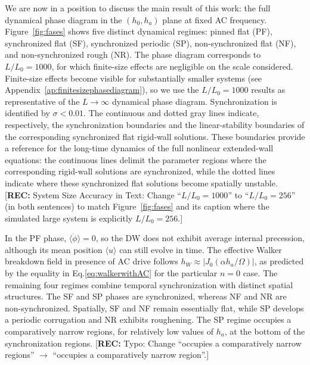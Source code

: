 \documentclass[prb,aps,twocolumn,superscriptaddress,floatfix]{revtex4-1}
\newcommand{\rec}[1]{{\color{magenta}[\textbf{REC:} #1]}}
\begin{document}
We are now in a position to discuss the main result of this work: the full dynamical phase diagram in the $(h_0,h_a)$ plane at fixed AC frequency. Figure~\ref{fig:fases} shows five distinct dynamical regimes: pinned flat (PF), synchronized flat (SF), synchronized periodic (SP), non-synchronized flat (NF), and non-synchronized rough (NR). The phase diagram corresponds to $L/L_0=1000$, for which finite-size effects are negligible on the scale considered. Finite-size effects become visible for substantially smaller systems (see Appendix~\ref{ap:finitesizephasediagram}), so we use the $L/L_0=1000$ results as representative of the $L\to\infty$ dynamical phase diagram. Synchronization is identified by $\sigma<0.01$. The continuous and dotted gray lines indicate, respectively, the synchronization boundaries and the linear-stability boundaries of the corresponding synchronized flat rigid-wall solutions. These boundaries provide a reference for the long-time dynamics of the full nonlinear extended-wall equations: the continuous lines delimit the parameter regions where the corresponding rigid-wall solutions are synchronized, while the dotted lines indicate where these synchronized flat solutions become spatially unstable.
\rec{System Size Accuracy in Text: Change ``$L/L_0=1000$'' to ``$L/L_0=256$'' (in both sentences) to match Figure~\ref{fig:fases} and its caption where the simulated large system is explicitly $L/L_0=256$.}


In the PF phase, $\langle\dot{\phi}\rangle=0$, so the DW does not exhibit average internal precession, although its mean position $\langle u\rangle$ can still evolve in time. The effective Walker breakdown field in presence of AC drive follows $h_W \approx |J_0(\alpha h_a/\Omega)|$, as predicted by the equality in Eq.\eqref{eq:walkerwithAC} for the particular $n=0$ case. The remaining four regimes combine temporal synchronization with distinct spatial structures. The SF and SP phases are synchronized, whereas NF and NR are non-synchronized. Spatially, SF and NF remain essentially flat, while SP develops a periodic corrugation and NR exhibits roughening. 
The SP regime occupies a comparatively narrow regions, for relatively low values of $h_a$, at the bottom of the synchronization regions. 
\rec{Typo: Change ``occupies a comparatively narrow regions'' $\to$ ``occupies a comparatively narrow region''.}
\end{document}
